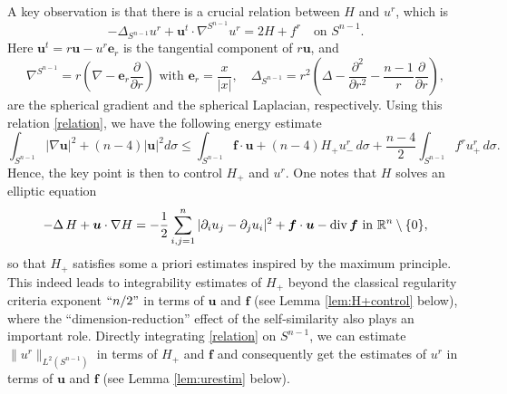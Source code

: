 \documentclass[12pt]{amsart}
\renewcommand{\div}{{\rm div \thinspace }}
\newcommand{\Bu}{{\boldsymbol{u}}}
\newcommand{\Be}{{\boldsymbol{e}}}
\newcommand{\Bf}{{\boldsymbol{f}}}
\begin{document}
	A key observation is that there is a crucial relation between $H$ and $u^r$, which is
	\begin{equation} \label{relation}
		-\Delta_{S^{n-1}}u^{r} + 
		\Bu^{t} \cdot\nabla^{S^{n-1}} u^{r}  
		= 2H+{f}^{r} \quad \text{on }S^{n-1}.
	\end{equation}
	Here
	$\Bu^{t}=r\Bu-u^r \Be_r$ is the tangential component of $r\Bu$, and  
	\begin{equation}\label{eq:sphegradi}
		\nabla^{S^{n-1}} = r\left(\nabla -\Be_r\frac{\partial}{\partial r}\right) \,\,\text{with}\,\, \Be_r=\frac{x}{|x|}, \quad \Delta_{S^{n-1}} = r^2\left(\Delta -\frac{\partial^2}{\partial r^2}-\frac{n-1}{r}\frac{\partial}{\partial r}\right),
	\end{equation}   
	are the spherical gradient and the spherical Laplacian, respectively.
	Using this relation \eqref{relation}, we have the following energy estimate 
	\begin{equation*}
		\int_{S^{n-1}} |\nabla \Bu|^2 +(n-4)|\Bu|^2 d\sigma
		\leq 	\int_{S^{n-1}} \Bf\cdot \Bu + (n-4)H_{+} u^r_{-}\,  d\sigma + \frac{n-4}{2} \int_{S^{n-1}} f^r u^r_{+}\, d\sigma.
	\end{equation*}
	Hence, the key point is then to control $H_+$ and $u^r$.  One notes that $H$  solves an elliptic equation 
	\begin{align} \label{eqforH_0}
		-\Delta \, H
		+ \Bu \cdot \nabla H
		= - \frac{1}{2} \sum_{i,j=1}^{n}|\partial_i u_j - \partial_j u_i |^2
		+\Bf\cdot \Bu - \div \Bf  \text{ in }\mathbb{R}^n \setminus \{0\},
	\end{align}
	so that $H_+$ satisfies some a priori estimates inspired by the maximum principle.  
	This indeed leads to integrability estimates of $H_+$ beyond the classical regularity criteria exponent $``n/2"$ in terms of $\Bu$ and  $\Bf$ (see Lemma \ref{lem:H+control} below), where the ``dimension-reduction” effect of the self-similarity also plays an important role. Directly integrating \eqref{relation} on $S^{n-1}$, we can estimate $\|u^r\|_{L^2(S^{n-1})}$ in terms of  $H_+$ and $\Bf$ and  consequently get the estimates of $u^r$ in terms of  $\Bu$ and $\Bf$ (see Lemma \ref{lem:urestim} below). 
\end{document}
